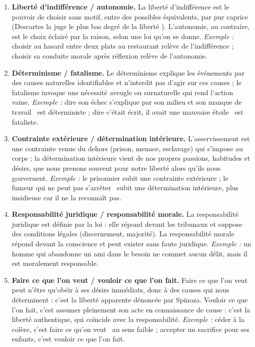 \documentclass[11pt]{article}
\newcommand{\cle}[1]{{\popxbold\color{popdark}#1}}
\begin{document}
\begin{corrige}
\begin{enumerate}
\item \textbf{\cle{Liberté d'indifférence} / \cle{autonomie}.} La liberté d'indifférence est le pouvoir de choisir sans motif, entre des possibles équivalents, par pur caprice (Descartes la juge \guillemotleft le plus bas degré de la liberté \guillemotright). L'autonomie, au contraire, est le choix éclairé par la raison, selon une loi qu'on se donne. \emph{Exemple :} choisir au hasard entre deux plats au restaurant relève de l'indifférence ; choisir sa conduite morale après réflexion relève de l'autonomie.
\item \textbf{\cle{Déterminisme} / \cle{fatalisme}.} Le déterminisme explique les événements par des causes naturelles identifiables et n'interdit pas d'agir sur ces causes ; le fatalisme invoque une nécessité aveugle ou surnaturelle qui rend l'action vaine. \emph{Exemple :} dire \guillemotleft son échec s'explique par son milieu et son manque de travail \guillemotright\ est déterministe ; dire \guillemotleft c'était écrit, il avait une mauvaise étoile \guillemotright\ est fataliste.
\item \textbf{\cle{Contrainte extérieure} / \cle{détermination intérieure}.} L'asservissement est une contrainte venue du dehors (prison, menace, esclavage) qui s'impose au corps ; la détermination intérieure vient de nos propres passions, habitudes et désirs, que nous prenons souvent pour notre liberté alors qu'ils nous gouvernent. \emph{Exemple :} le prisonnier subit une contrainte extérieure ; le fumeur qui \guillemotleft ne peut pas s'arrêter \guillemotright\ subit une détermination intérieure, plus insidieuse car il ne la reconnaît pas.
\item \textbf{Responsabilité juridique / responsabilité morale.} La responsabilité juridique est définie par la loi : elle répond devant les tribunaux et suppose des conditions légales (discernement, majorité). La responsabilité morale répond devant la conscience et peut exister sans faute juridique. \emph{Exemple :} un homme qui abandonne un ami dans le besoin ne commet aucun délit, mais il est moralement responsable.
\item \textbf{Faire ce que l'on veut / vouloir ce que l'on fait.} Faire ce que l'on veut peut n'être qu'obéir à ses désirs immédiats, donc à des causes qui nous déterminent : c'est la liberté apparente dénoncée par Spinoza. Vouloir ce que l'on fait, c'est assumer pleinement son acte en connaissance de cause : c'est la liberté authentique, qui coïncide avec la responsabilité. \emph{Exemple :} céder à la colère, c'est \guillemotleft faire ce qu'on veut \guillemotright\ au sens faible ; accepter un sacrifice pour ses enfants, c'est vouloir ce que l'on fait.
\end{enumerate}
\end{corrige}
\end{document}

